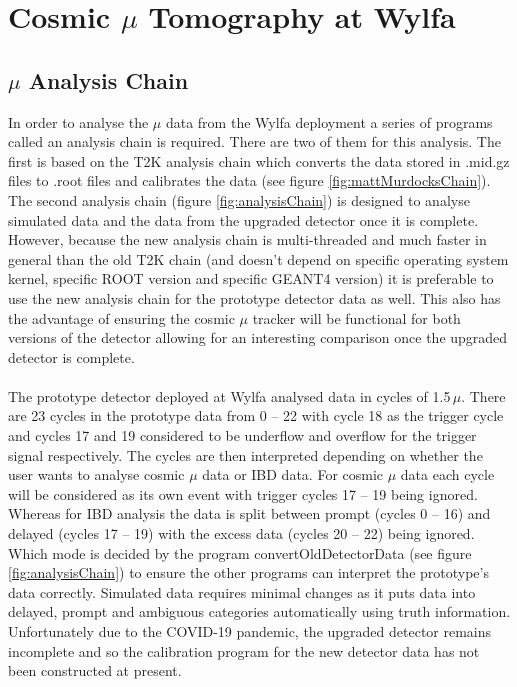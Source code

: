 
\chapter{Cosmic $\mu$ Tomography at Wylfa}\label{chp:cosmicMuonTomography}

\ifpdf
    \graphicspath{{Chapter5/Figs/Raster/}{Chapter5/Figs/PDF/}{Chapter5/Figs/}}
\else
    \graphicspath{{Chapter5/Figs/Vector/}{Chapter5/Figs/}}
\fi

\section{$\mu$ Analysis Chain}\label{sec:muonAnalysisChain}
In order to analyse the $\mu$ data from the Wylfa deployment a series of programs called an analysis chain is required. There are two of them for this analysis. The first is based on the T2K analysis chain which converts the data stored in .mid.gz files to .root files and calibrates the data (see figure \ref{fig:mattMurdocksChain}). The second analysis chain (figure \ref{fig:analysisChain}) is designed to analyse simulated data and the data from the upgraded detector once it is complete. However, because the new analysis chain is multi-threaded and much faster in general than the old T2K chain (and doesn't depend on specific operating system kernel, specific ROOT version and specific GEANT4 version) it is preferable to use the new analysis chain for the prototype detector data as well. This also has the advantage of ensuring the cosmic $\mu$ tracker will be functional for both versions of the detector allowing for an interesting comparison once the upgraded detector is complete. 
\\\\The prototype detector deployed at Wylfa analysed data in cycles of 1.5\,$\mu$. There are 23 cycles in the prototype data from 0 -- 22 with cycle 18 as the trigger cycle and cycles 17 and 19 considered to be underflow and overflow for the trigger signal respectively. The cycles are then interpreted depending on whether the user wants to analyse cosmic $\mu$ data or IBD data. For cosmic $\mu$ data each cycle will be considered as its own event with trigger cycles 17 -- 19 being ignored. Whereas for IBD analysis the data is split between prompt (cycles 0 -- 16) and delayed (cycles 17 -- 19) with the excess data (cycles 20 -- 22) being ignored. Which mode is decided by the program convertOldDetectorData (see figure \ref{fig:analysisChain}) to ensure the other programs can interpret the prototype's data correctly. Simulated data requires minimal changes as it puts data into delayed, prompt and ambiguous categories automatically using truth information. Unfortunately due to the COVID-19 pandemic, the upgraded detector remains incomplete and so the calibration program for the new detector data has not been constructed at present. 

